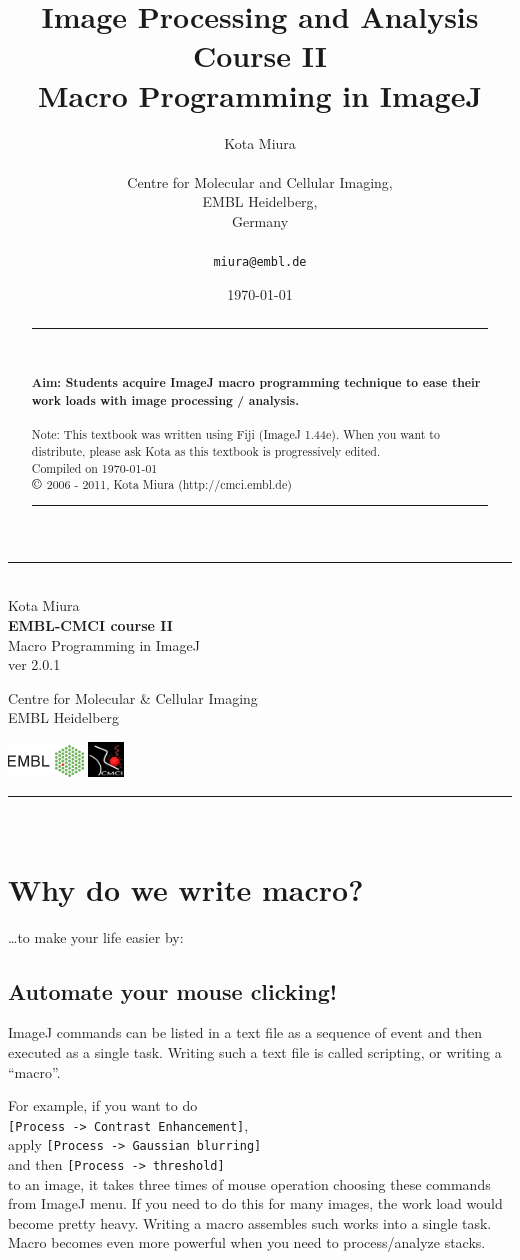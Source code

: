 \documentclass[11pt,a4paper,oneside]{report}
\newcommand{\ijmenu}[1]{\texttt{\small#1}}
\newcommand{\HRule}{\rule{\linewidth}{0.5mm}}
\newcommand*{\titleTH}{\begingroup%
\raggedleft
\HRule\\
\vspace*{\baselineskip}
{\Large Kota Miura}\\[0.167\textheight]

{\bfseries EMBL-CMCI course II}\\[\baselineskip]
{\textcolor{Medium}{\Huge Macro Programming in ImageJ}}\\[\baselineskip]
{\small ver 2.0.1}\par
\vfill

{\Large Centre for Molecular \& Cellular Imaging\\EMBL Heidelberg}\par
\includegraphics[width=0.15\textwidth]{fig/rgb_logo_2006_win.eps} 
\includegraphics[width=0.07\textwidth]{fig/Icon30pedge.jpg}\\[1cm] 
\vspace*{3\baselineskip}
\HRule\\
\endgroup}
\begin{document}
\title{Image Processing and Analysis Course II\\
Macro Programming in ImageJ}
\author{Kota Miura\\
\\
  Centre for Molecular and Cellular Imaging,\\
  EMBL Heidelberg,\\
  Germany\\
\\
\texttt{miura@embl.de}
}

\date{\today}

\pagestyle{empty}
\titleTH
\clearpage
\pagestyle{fancyplain}
\begin{abstract}
\HRule
\\
\\
\textbf{Aim: Students acquire ImageJ macro programming technique 
to ease their work loads with image processing / analysis.}
\\
\\
Note: This textbook was written using Fiji (ImageJ 1.44e). 
When you want to distribute, please ask Kota as this textbook is progressively edited.
\\
Compiled on \today \\
$\copyright$ 2006 - 2011, Kota Miura (http://cmci.embl.de)
\\
\HRule
\end{abstract}

\begingroup
\hypersetup{linkcolor=black}
\tableofcontents
\endgroup

\clearpage
\setcounter{chapter}{2}
\section{Why do we write macro?}

\dots to make your life easier by:

\subsection{Automate your mouse clicking!}

ImageJ commands can be listed in a text file as a sequence of event and then executed as a single task. 
Writing such a text file is called scripting, or writing a ``macro''. 

For example, if you want to do \\
\ijmenu{[Process -> Contrast Enhancement]}, \\
apply \ijmenu{[Process -> Gaussian blurring]} \\
and then \ijmenu{[Process -> threshold]} \\
to an image, it takes three times of mouse operation choosing these commands from ImageJ menu. 
If you need to do this for many images, the work load would become pretty heavy. 
Writing a macro assembles such works into a single task. Macro becomes even more powerful 
when you need to process/analyze stacks. 
\end{document}
